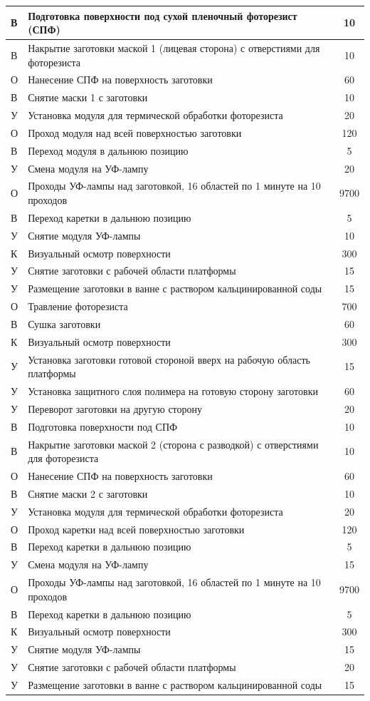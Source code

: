 \begin{longtable}[c]{|p{1cm}|p{11cm}|c|}
		В & Подготовка поверхности под сухой пленочный фоторезист (СПФ) & 10 \tabularnewline \hline
		В & Накрытие заготовки маской 1 (лицевая сторона) с отверстиями для фоторезиста & 10 \tabularnewline \hline
		О & Нанесение СПФ на поверхность заготовки & 60 \tabularnewline \hline
		В & Снятие маски 1 с заготовки & 10 \tabularnewline \hline
		У & Установка модуля для термической обработки фоторезиста & 20 \tabularnewline \hline
		О & Проход модуля над всей поверхностью заготовки & 120 \tabularnewline \hline
		В & Переход модуля в дальнюю позицию & 5 \tabularnewline \hline
		У & Смена модуля на УФ-лампу & 20 \tabularnewline \hline
		О & Проходы УФ-лампы над заготовкой, 16 областей по 1 минуте на 10 проходов & 9700 \tabularnewline \hline
		В & Переход каретки в дальнюю позицию & 5 \tabularnewline \hline
		У & Снятие модуля УФ-лампы & 10 \tabularnewline \hline
		К & Визуальный осмотр поверхности & 300 \tabularnewline \hline
		У & Снятие заготовки с рабочей области платформы & 15 \tabularnewline \hline
		У & Размещение заготовки в ванне с раствором кальцинированной соды & 15 \tabularnewline \hline
		О & Травление фоторезиста & 700 \tabularnewline \hline
		В & Сушка заготовки & 60 \tabularnewline \hline
		К & Визуальный осмотр поверхности & 300 \tabularnewline \hline
		У & Установка заготовки готовой стороной вверх на рабочую область платформы & 15 \tabularnewline \hline
		У & Установка защитного слоя полимера на готовую сторону заготовки & 60 \tabularnewline \hline
		У & Переворот заготовки на другую сторону & 20 \tabularnewline \hline
		В & Подготовка поверхности под СПФ & 10 \tabularnewline \hline
		В & Накрытие заготовки маской 2 (сторона с разводкой) с отверстиями для фоторезиста & 10 \tabularnewline \hline
		О & Нанесение СПФ на поверхность заготовки & 60 \tabularnewline \hline
		В & Снятие маски 2 с заготовки & 10 \tabularnewline \hline
		У & Установка модуля для термической обработки фоторезиста & 20 \tabularnewline \hline
		О & Проход каретки над всей поверхностью заготовки & 120 \tabularnewline \hline
		В & Переход каретки в дальнюю позицию & 5 \tabularnewline \hline
		У & Смена модуля на УФ-лампу & 15 \tabularnewline \hline
		О & Проходы УФ-лампы над заготовкой, 16 областей по 1 минуте на 10 проходов & 9700 \tabularnewline \hline
		В & Переход каретки в дальнюю позицию & 5 \tabularnewline \hline
		К & Визуальный осмотр поверхности & 300 \tabularnewline \hline
		У & Снятие модуля УФ-лампы & 15 \tabularnewline \hline
		У & Снятие заготовки с рабочей области платформы & 20 \tabularnewline \hline
		У & Размещение заготовки в ванне с раствором кальцинированной соды & 15 \tabularnewline \hline

\end{longtable}
